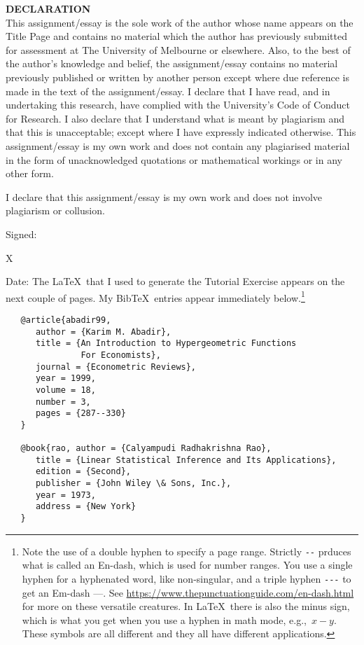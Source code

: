 \noindent\textbf{DECLARATION}\\[\baselineskip] This assignment/essay
is the sole work of the author whose name appears on the Title Page
and contains no material which the author has previously submitted for
assessment at The University of Melbourne or elsewhere.  Also, to the
best of the author's knowledge and belief, the assignment/essay
contains no material previously published or written by another person
except where due reference is made in the text of the
assignment/essay.  I declare that I have read, and in undertaking this
research, have complied with the University's Code of Conduct for
Research.  I also declare that I understand what is meant by
plagiarism and that this is unacceptable; except where I have
expressly indicated otherwise.  This assignment/essay is my own work
and does not contain any plagiarised material in the form of
unacknowledged quotations or mathematical workings or in any other
form.  \vspace{0.5in}

\noindent I declare that this assignment/essay is my own work and does
not involve plagiarism or collusion.  \vspace{0.5in}

\noindent Signed:\hspace{1cm} \begin{minipage}[t]{0.2\textwidth}
	\begin{center}
		\mbox{X} \\
		\yourName \end{center}
\end{minipage}
\hfill Date: \submissionDate
%
\newpage
%
% 
The \LaTeX\ that I used to generate the Tutorial Exercise appears on
the next couple of pages.  My Bib\TeX\ entries appear immediately
below.\footnote{Note the use of a double hyphen to specify a page
range.  Strictly \verb+--+ prduces what is called an En-dash, which is
used for number ranges.  You use a single hyphen for a hyphenated
word, like non-singular, and a triple hyphen \verb+---+ to get an
Em-dash ---.  See
\url{https://www.thepunctuationguide.com/en-dash.html} for more on
these versatile creatures.  In \LaTeX\ there is also the minus sign,
which is what you get when you use a hyphen in math mode, e.g.,\ \(
x-y \).  These symbols are all different and they all have different
applications.}

\begin{lstlisting}
   @article{abadir99, 
      author = {Karim M. Abadir}, 
      title = {An Introduction to Hypergeometric Functions 
               For Economists}, 
      journal = {Econometric Reviews}, 
      year = 1999, 
      volume = 18, 
      number = 3, 
      pages = {287--330} 
   }

   @book{rao, author = {Calyampudi Radhakrishna Rao}, 
      title = {Linear Statistical Inference and Its Applications}, 
      edition = {Second},
      publisher = {John Wiley \& Sons, Inc.}, 
      year = 1973, 
      address = {New York} 
   } 
\end{lstlisting}

